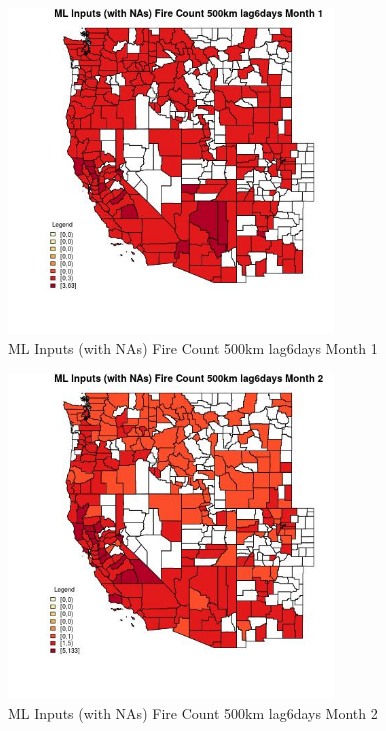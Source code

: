 \begin{figure} 
\centering  
\includegraphics[width=0.77\textwidth]{Code_Outputs/Report_ML_input_PM25_Step4_part_e_de_duplicated_aves_compiled_2019-05-21wNAs_CountyFire_Count_500km_lag6daysmedianMonth1.jpg} 
\caption{\label{fig:Report_ML_input_PM25_Step4_part_e_de_duplicated_aves_compiled_2019-05-21wNAsCountyFire_Count_500km_lag6daysmedianMonth1}ML Inputs (with NAs) Fire Count 500km lag6days Month 1} 
\end{figure} 
 

\begin{figure} 
\centering  
\includegraphics[width=0.77\textwidth]{Code_Outputs/Report_ML_input_PM25_Step4_part_e_de_duplicated_aves_compiled_2019-05-21wNAs_CountyFire_Count_500km_lag6daysmedianMonth2.jpg} 
\caption{\label{fig:Report_ML_input_PM25_Step4_part_e_de_duplicated_aves_compiled_2019-05-21wNAsCountyFire_Count_500km_lag6daysmedianMonth2}ML Inputs (with NAs) Fire Count 500km lag6days Month 2} 
\end{figure} 
 

